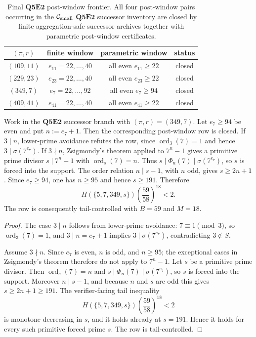 \begin{table}[ht]
\centering
\small
\begin{tabular}{c|c|c|c}
\((\pi,r)\) & finite window & parametric window & status \\
\hline
\((109,11)\) &
\(e_{11}=22,\ldots,40\) &
all even \(e_{11}\ge22\) &
closed \\
\hline
\((229,23)\) &
\(e_{23}=22,\ldots,40\) &
all even \(e_{23}\ge22\) &
closed \\
\hline
\((349,7)\) &
\(e_7=22,\ldots,92\) &
all even \(e_7\ge94\) &
closed \\
\hline
\((409,41)\) &
\(e_{41}=22,\ldots,40\) &
all even \(e_{41}\ge22\) &
closed \\
\end{tabular}
\caption{Final \(\mathbf{Q5E2}\) post-window frontier.  All four
post-window pairs occurring in the \(\mathcal C_{\mathrm{small}}\) \(\mathbf{Q5E2}\) successor
inventory are closed by finite aggregation-safe successor archives together
with parametric post-window certificates.}
\label{tab:q5e2-final-post-window-frontier}
\end{table}
\FloatBarrier

\begin{criterion}[Parametric post-window closure for \((\pi,r)=(349,7)\)]
\label{crit:q5e2-pi349-r7-parametric-post-window}
Work in the \(\mathbf{Q5E2}\) successor branch with \((\pi,r)=(349,7)\).
Let \(e_7\ge94\) be even and put \(n:=e_7+1\).  Then the corresponding
post-window row is closed.  If \(3\mid n\), lower-prime avoidance refutes the
row, since \(\operatorname{ord}_3(7)=1\) and hence
\(3\mid\sigma(7^{e_7})\).  If \(3\nmid n\), Zsigmondy's theorem applied to
\(7^n-1\) gives a primitive prime divisor \(s\mid7^n-1\) with
\(\operatorname{ord}_s(7)=n\).  Thus
\(s\mid\Phi_n(7)\mid\sigma(7^{e_7})\), so \(s\) is forced into the support.
The order relation \(n\mid s-1\), with \(n\) odd, gives
\(s\ge2n+1\).  Since \(e_7\ge94\), one has \(n\ge95\) and hence \(s\ge191\).
Therefore
\[
  H(\{5,7,349,s\})
  \left(\frac{59}{58}\right)^{18}<2.
\]
The row is consequently tail-controlled with \(B=59\) and \(M=18\).
\end{criterion}

\begin{proof}
The case \(3\mid n\) follows from lower-prime avoidance: \(7\equiv1\pmod3\),
so \(\operatorname{ord}_3(7)=1\), and \(3\mid n=e_7+1\) implies
\(3\mid\sigma(7^{e_7})\), contradicting \(3\notin S\).

Assume \(3\nmid n\).  Since \(e_7\) is even, \(n\) is odd, and \(n\ge95\); the
exceptional cases in Zsigmondy's theorem therefore do not apply to \(7^n-1\).
Let \(s\) be a primitive prime divisor.  Then
\(\operatorname{ord}_s(7)=n\) and \(s\mid\Phi_n(7)\mid\sigma(7^{e_7})\), so
\(s\) is forced into the support.  Moreover \(n\mid s-1\), and because \(n\)
and \(s\) are odd this gives \(s\ge2n+1\ge191\).
The verifier-facing tail inequality
\[
  H(\{5,7,349,s\})
  \left(\frac{59}{58}\right)^{18}<2
\]
is monotone decreasing in \(s\), and it holds already at \(s=191\).  Hence it
holds for every such primitive forced prime \(s\).  The row is tail-controlled.
\end{proof}


